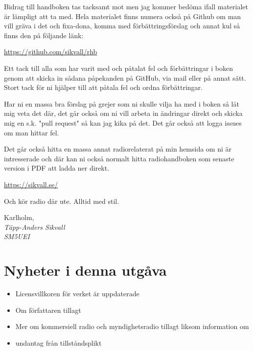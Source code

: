 Bidrag till handboken tas tacksamt mot men jag kommer bedöma ifall materialet
är lämpligt att ta med.  Hela materialet finns numera också på Github om man
vill gräva i det och fixa-dona, komma med förbättrings\-förslag och annat kul
så finns den på följande länk:

\href{https://github.com/sikvall/rhb/}{https://github.com/sikvall/rhb}

Ett tack till alla som har varit med och påtalat fel och förbättringar i boken
genom att skicka in sådana påpekanden på GitHub, via mail eller på annat sätt.
Stort tack för ni hjälper till att påtala fel och ordna förbättringar.

Har ni en massa bra förslag på grejer som ni skulle vilja ha med i boken så låt
mig veta det där, det går också om ni vill arbeta in ändringar direkt och skicka
mig en s.k. "pull request" så kan jag kika på det. Det går också att logga
issues om man hittar fel.

Det går också hitta en massa annat radiorelaterat på min hemsida om ni är
intresserade och där kan ni också normalt hitta radiohandboken som senaste
version i PDF att ladda ner direkt.

\href{https://sikvall.se}{https://sikvall.se/}

Och kör radio där ute. Alltid med stil.

\vspace{4mm}

Karlholm, \DokumentDatum\\
\textit{Täpp-Anders Sikvall\\
	SM5UEI}

\clearpage

\section*{Nyheter i denna utgåva}

\begin{itemize}
  \item Licensvillkoren för verket är uppdaterade
  \item Om författaren tillagt
  \item Mer om kommersiell radio och myndighetsradio tillagt liksom information om
  \item undantag från tillståndsplikt
\end{itemize}

\clearpage


